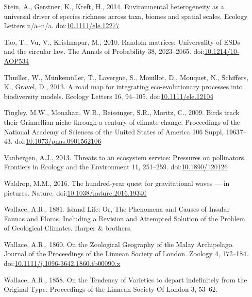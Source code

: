 \hypertarget{ref-Stein2014}{}
Stein, A., Gerstner, K., Kreft, H., 2014. Environmental heterogeneity as
a universal driver of species richness across taxa, biomes and spatial
scales. Ecology Letters n/a--n/a.
doi:\href{https://doi.org/10.1111/ele.12277}{10.1111/ele.12277}

\hypertarget{ref-Tao2010}{}
Tao, T., Vu, V., Krishnapur, M., 2010. Random matrices: Universality of
ESDs and the circular law. The Annals of Probability 38, 2023--2065.
doi:\href{https://doi.org/10.1214/10-AOP534}{10.1214/10-AOP534}

\hypertarget{ref-Thuiller2013}{}
Thuiller, W., Münkemüller, T., Lavergne, S., Mouillot, D., Mouquet, N.,
Schiffers, K., Gravel, D., 2013. A road map for integrating
eco-evolutionary processes into biodiversity models. Ecology Letters 16,
94--105. doi:\href{https://doi.org/10.1111/ele.12104}{10.1111/ele.12104}

\hypertarget{ref-Tingley2009}{}
Tingley, M.W., Monahan, W.B., Beissinger, S.R., Moritz, C., 2009. Birds
track their Grinnellian niche through a century of climate change.
Proceedings of the National Academy of Sciences of the United States of
America 106 Suppl, 19637--43.
doi:\href{https://doi.org/10.1073/pnas.0901562106}{10.1073/pnas.0901562106}

\hypertarget{ref-Vanbergen2013}{}
Vanbergen, A.J., 2013. Threats to an ecosystem service: Pressures on
pollinators. Frontiers in Ecology and the Environment 11, 251--259.
doi:\href{https://doi.org/10.1890/120126}{10.1890/120126}

\hypertarget{ref-Waldrop2016}{}
Waldrop, M.M., 2016. The hundred-year quest for gravitational waves ---
in pictures. Nature.
doi:\href{https://doi.org/10.1038/nature.2016.19340}{10.1038/nature.2016.19340}

\hypertarget{ref-wallace1881island}{}
Wallace, A.R., 1881. Island Life: Or, The Phenomena and Causes of
Insular Faunas and Floras, Including a Revision and Attempted Solution
of the Problem of Geological Climates. Harper \& brothers.

\hypertarget{ref-Wallace1860}{}
Wallace, A.R., 1860. On the Zoological Geography of the Malay
Archipelago. Journal of the Proceedings of the Linnean Society of
London. Zoology 4, 172--184.
doi:\href{https://doi.org/10.1111/j.1096-3642.1860.tb00090.x}{10.1111/j.1096-3642.1860.tb00090.x}

\hypertarget{ref-Wallace1858}{}
Wallace, A.R., 1858. On the Tendency of Varieties to depart indefinitely
from the Original Type. Proceedings of the Linnean Society Of London 3,
53--62.

